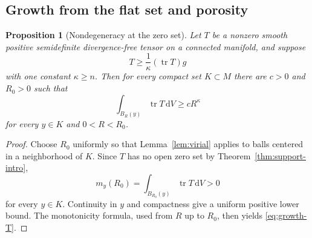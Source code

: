 \documentclass[11pt,reqno]{amsart}
\newtheorem{proposition}[theorem]{Proposition}
\theoremstyle{definition}
\theoremstyle{remark}
\newcommand{\tr}{\operatorname{tr}}
\newcommand{\dd}{\,\mathrm d}
\begin{document}
\subsection{Growth from the flat set and porosity}

\begin{proposition}[Nondegeneracy at the zero set]\label{prop:nondegrowth}
Let $T$ be a nonzero smooth positive semidefinite divergence-free tensor on a connected manifold, and suppose
\[
T\ge\frac1\kappa(\tr T)g
\]
with one constant $\kappa\ge n$.  Then for every compact set $K\subset M$ there are $c>0$ and $R_0>0$ such that
\begin{equation}\label{eq:growth-T}
\int_{B_R(y)}\tr T\dd V\ge cR^\kappa
\end{equation}
for every $y\in K$ and $0<R<R_0$.
\end{proposition}

\begin{proof}
Choose $R_0$ uniformly so that Lemma~\ref{lem:virial} applies to balls centered in a neighborhood of $K$.  Since $T$ has no open zero set by Theorem~\ref{thm:support-intro},
\[
m_y(R_0)=\int_{B_{R_0}(y)}\tr T\dd V>0
\]
for every $y\in K$.  Continuity in $y$ and compactness give a uniform positive lower bound.  The monotonicity formula, used from $R$ up to $R_0$, then yields \eqref{eq:growth-T}.
\end{proof}
\end{document}
